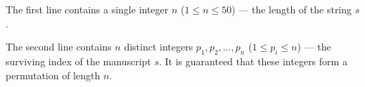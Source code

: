 The first line contains a single integer $n$ ($1 \le n \le 50$) --- the length of the string $s$.

The second line contains $n$ distinct integers $p_1, p_2, \dots, p_n$ ($1 \le p_i \le n$) --- the surviving index of the manuscript $s$. It is guaranteed that these integers form a permutation of length $n$.
